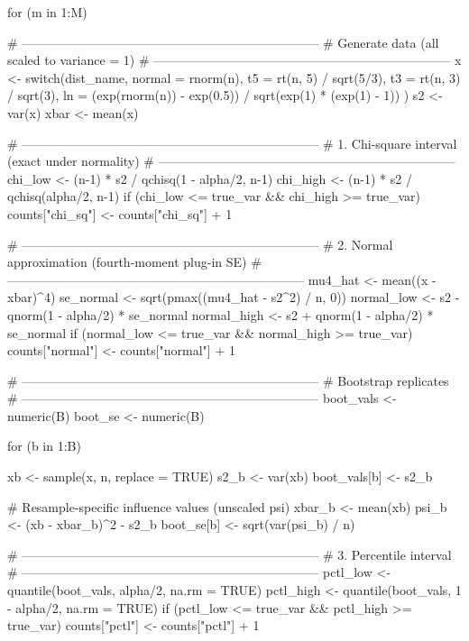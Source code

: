   for (m in 1:M) {
    # -----------------------------------------------------------------------
    # Generate data (all scaled to variance = 1)
    # -----------------------------------------------------------------------
    x <- switch(dist_name,
      normal = rnorm(n),
      t5     = rt(n, 5) / sqrt(5/3),
      t3     = rt(n, 3) / sqrt(3),
      ln     = (exp(rnorm(n)) - exp(0.5)) / sqrt(exp(1) * (exp(1) - 1))
    )
    s2 <- var(x)
    xbar <- mean(x)

    # -----------------------------------------------------------------------
    # 1. Chi-square interval (exact under normality)
    # -----------------------------------------------------------------------
    chi_low  <- (n-1) * s2 / qchisq(1 - alpha/2, n-1)
    chi_high <- (n-1) * s2 / qchisq(alpha/2, n-1)
    if (chi_low <= true_var && chi_high >= true_var)
      counts["chi_sq"] <- counts["chi_sq"] + 1

    # -----------------------------------------------------------------------
    # 2. Normal approximation (fourth-moment plug-in SE)
    # -----------------------------------------------------------------------
    mu4_hat <- mean((x - xbar)^4)
    se_normal <- sqrt(pmax((mu4_hat - s2^2) / n, 0))
    normal_low  <- s2 - qnorm(1 - alpha/2) * se_normal
    normal_high <- s2 + qnorm(1 - alpha/2) * se_normal
    if (normal_low <= true_var && normal_high >= true_var)
      counts["normal"] <- counts["normal"] + 1

    # -----------------------------------------------------------------------
    # Bootstrap replicates
    # -----------------------------------------------------------------------
    boot_vals <- numeric(B)
    boot_se   <- numeric(B)

    for (b in 1:B) {
      xb <- sample(x, n, replace = TRUE)
      s2_b <- var(xb)
      boot_vals[b] <- s2_b

      # Resample-specific influence values (unscaled psi)
      xbar_b <- mean(xb)
      psi_b  <- (xb - xbar_b)^2 - s2_b
      boot_se[b] <- sqrt(var(psi_b) / n)
    }

    # -----------------------------------------------------------------------
    # 3. Percentile interval
    # -----------------------------------------------------------------------
    pctl_low  <- quantile(boot_vals, alpha/2, na.rm = TRUE)
    pctl_high <- quantile(boot_vals, 1 - alpha/2, na.rm = TRUE)
    if (pctl_low <= true_var && pctl_high >= true_var)
      counts["pctl"] <- counts["pctl"] + 1

}
